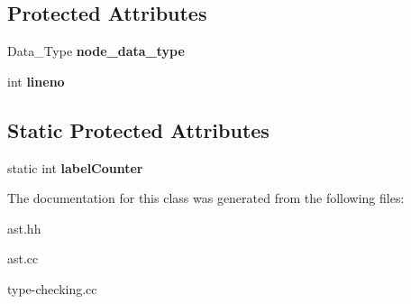\subsection*{Protected Attributes}
\begin{DoxyCompactItemize}
\item 
\mbox{\label{classAst_a09e0a05ac8ec17d32f94f645b6a83d84}} 
Data\+\_\+\+Type {\bfseries node\+\_\+data\+\_\+type}
\item 
\mbox{\label{classAst_abaeced57d7c8ee027f71e62d0eba22e6}} 
int {\bfseries lineno}
\end{DoxyCompactItemize}
\subsection*{Static Protected Attributes}
\begin{DoxyCompactItemize}
\item 
\mbox{\label{classAst_ad0766f2d2f39a7575c5e8210dc9aad9f}} 
static int {\bfseries label\+Counter}
\end{DoxyCompactItemize}


The documentation for this class was generated from the following files\+:\begin{DoxyCompactItemize}
\item 
ast.\+hh\item 
ast.\+cc\item 
type-\/checking.\+cc\end{DoxyCompactItemize}
